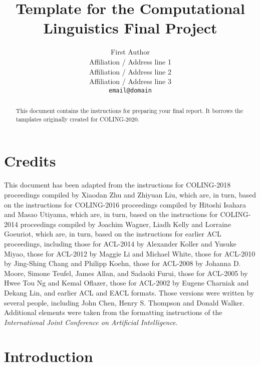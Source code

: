 \documentclass[11pt]{article}
\title{Template for the Computational Linguistics Final Project}
\author{First Author \\
  Affiliation / Address line 1 \\
  Affiliation / Address line 2 \\
  Affiliation / Address line 3 \\
  {\tt email@domain} 
  \\}
\date{}
\begin{document}
\maketitle
\begin{abstract}
  This document contains the instructions for preparing your final report. 
  It borrows the tamplates originally created for COLING-2020.
\end{abstract}

\section{Credits}

This document has been adapted from the instructions for  
COLING-2018 proceedings compiled by Xiaodan Zhu and Zhiyuan Liu,
which are, in turn, based on
the instructions for
COLING-2016 proceedings compiled by Hitoshi Isahara and Masao Utiyama,
which are, in turn, based on
the instructions for
COLING-2014 proceedings compiled by Joachim Wagner, Liadh Kelly
and Lorraine Goeuriot,
which are, in turn, based on the instructions for earlier ACL proceedings,
including 
those for ACL-2014 by Alexander Koller and Yusuke Miyao,
those for ACL-2012 by Maggie Li and Michael
White, those for ACL-2010 by Jing-Shing Chang and Philipp Koehn,
those for ACL-2008 by Johanna D. Moore, Simone Teufel, James Allan,
and Sadaoki Furui, those for ACL-2005 by Hwee Tou Ng and Kemal
Oflazer, those for ACL-2002 by Eugene Charniak and Dekang Lin, and
earlier ACL and EACL formats. Those versions were written by several
people, including John Chen, Henry S. Thompson and Donald
Walker. Additional elements were taken from the formatting
instructions of the {\em International Joint Conference on Artificial
  Intelligence}.

\section{Introduction}
\label{intro}

%
% 
\end{document}
